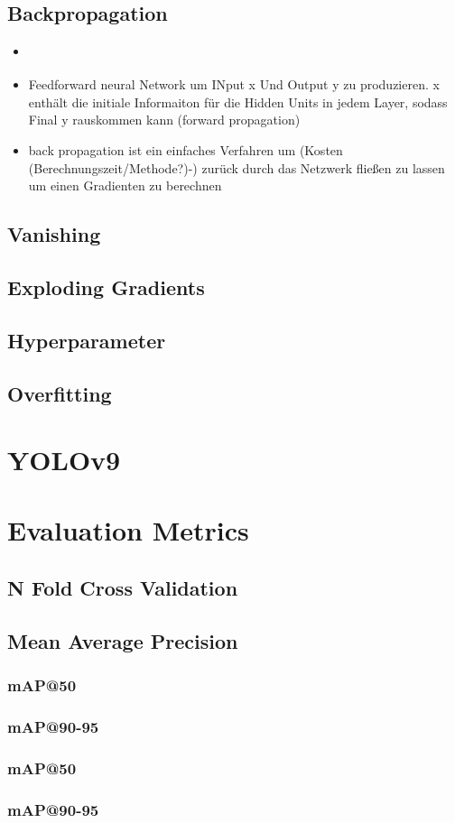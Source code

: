 \begin{itemize}
\end{itemize}
\subsection{Backpropagation}
\begin{itemize}
    \item \cite{Goodfellow-et-al-2016}
    \item Feedforward neural Network um INput x Und Output y zu produzieren. x enthält die initiale Informaiton für die Hidden Units in jedem Layer, sodass Final y rauskommen kann (forward propagation)
    \item back propagation ist ein einfaches Verfahren um (Kosten (Berechnungszeit/Methode?)-) zurück durch das Netzwerk fließen zu lassen um einen Gradienten zu berechnen
\end{itemize}
\subsection{Vanishing}
\subsection{Exploding Gradients}
\subsection{Hyperparameter}
\subsection{Overfitting}







\section{YOLOv9}

\section{Evaluation Metrics}
\subsection{N Fold Cross Validation}
\subsection{Mean Average Precision}
\subsubsection{mAP@50}
\subsubsection{mAP@90-95}

\subsubsection{mAP@50}
\subsubsection{mAP@90-95}


